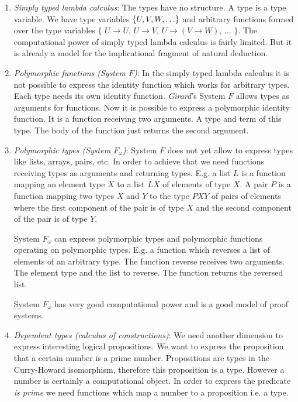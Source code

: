 \begin{enumerate}

\item \emph{Simply typed lambda calculus}:
    The types have no structure. A type is a type variable. We have type
    variables ${\{U, V, W, \ldots\}}$ and arbitrary functions formed over
    the type variables $\{$ $U \to U$, $U \to V$, $U \to (V \to W)$,
    $\ldots$ $\}$. The computational power of simply typed lambda calculus
    is fairly limited. But it is already a model for the implicational
    fragment of natural deduction.

\item \emph{Polymorphic functions (System $F$)}:
    In the simply typed lambda calculus it is not possible to express the
    identity function which works for arbitrary types. Each type needs its
    own identity function.  \emph{Girard}'s System $F$ allows types as
    arguments for functions. Now it is possible to express a polymorphic
    identity function. It is a function receiving two arguments. A type and
    term of this type. The body of the function just returns the second
    argument.


\item \emph{Polymorphic types (System $F_\omega$)}:
    System $F$ does not yet allow to express types like lists, arrays, pairs,
    etc. In order to achieve that we need functions receiving types as
    arguments and returning types. E.g. a list $L$ is a function mapping an
    element type $X$ to a list $L X$ of elements of type $X$. A pair $P$ is
    a function mapping two types $X$ and $Y$ to the type $P X Y$ of pairs of
    elements where the first component of the pair is of type $X$ and the
    second component of the pair is of type $Y$.

    System $F_\omega$ can express polymorphic types and polymorphic functions
        operating on polymorphic types. E.g. a function which reverses a list of
        elements of an arbitrary type. The function reverse receives two
        arguments. The element type and the list to reverse. The function
        returns the reversed list.


    System $F_\omega$ has very good computational power and is a good model of
    proof systems.

\item \emph{Dependent types (calculus of constructions)}:
    We need another dimension to express interesting logical propositions. We
    want to express the proposition that a certain number is a prime number.
    Propositions are types in the Curry-Howard isomorphism, therefore this
    proposition is a type. However a number is certainly a computational
    object. In order to express the predicate \emph{is prime} we need
    functions which map a number to a proposition i.e. a type.


\end{enumerate}
